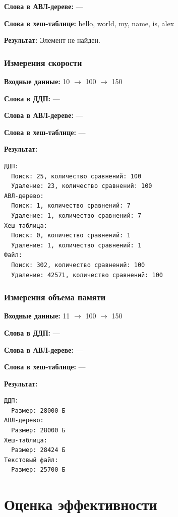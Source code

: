 \documentclass[a4paper,12pt]{extarticle}
\begin{document}
\textbf{Слова в АВЛ-дереве: }
---

\textbf{Слова в хеш-таблице: }
hello, world, my, name, is, alex

\textbf{Результат: }
Элемент не найден.



\subsubsection{Измерения скорости}

\textbf{Входные данные: }
10 $\rightarrow$ 100 $\rightarrow$ 150

\textbf{Слова в ДДП: }
---

\textbf{Слова в АВЛ-дереве: }
---

\textbf{Слова в хеш-таблице: }
---

\textbf{Результат: }

\begin{verbatim}
ДДП:
  Поиск: 25, количество сравнений: 100
  Удаление: 23, количество сравнений: 100
АВЛ-дерево:
  Поиск: 1, количество сравнений: 7
  Удаление: 1, количество сравнений: 7
Хеш-таблица:
  Поиск: 0, количество сравнений: 1
  Удаление: 1, количество сравнений: 1
Файл:
  Поиск: 302, количество сравнений: 100
  Удаление: 42571, количество сравнений: 100
\end{verbatim}



\subsubsection{Измерения объема памяти}

\textbf{Входные данные: }
11 $\rightarrow$ 100 $\rightarrow$ 150

\textbf{Слова в ДДП: }
---

\textbf{Слова в АВЛ-дереве: }
---

\textbf{Слова в хеш-таблице: }
---

\textbf{Результат: }

\begin{verbatim}
ДДП:
  Размер: 28000 Б
АВЛ-дерево:
  Размер: 28000 Б
Хеш-таблица:
  Размер: 28424 Б
Текстовый файл:
  Размер: 25700 Б
\end{verbatim}


\newpage

\section{Оценка эффективности}
\end{document}
